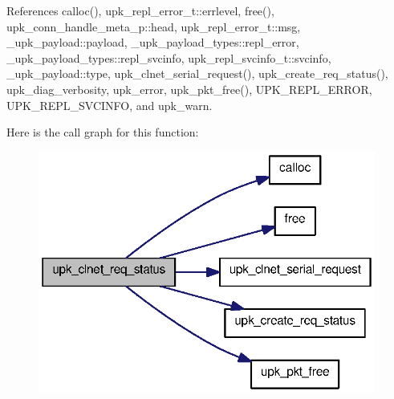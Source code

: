 References calloc(), upk\_\-repl\_\-error\_\-t::errlevel, free(), upk\_\-conn\_\-handle\_\-meta\_\-p::head, upk\_\-repl\_\-error\_\-t::msg, \_\-upk\_\-payload::payload, \_\-upk\_\-payload\_\-types::repl\_\-error, \_\-upk\_\-payload\_\-types::repl\_\-svcinfo, upk\_\-repl\_\-svcinfo\_\-t::svcinfo, \_\-upk\_\-payload::type, upk\_\-clnet\_\-serial\_\-request(), upk\_\-create\_\-req\_\-status(), upk\_\-diag\_\-verbosity, upk\_\-error, upk\_\-pkt\_\-free(), UPK\_\-REPL\_\-ERROR, UPK\_\-REPL\_\-SVCINFO, and upk\_\-warn.



Here is the call graph for this function:
\nopagebreak
\begin{figure}[H]
\begin{center}
\leavevmode
\includegraphics[width=314pt]{upk__client__net_8c_a222200fea80f3367f682ac816f8cd62b_cgraph}
\end{center}
\end{figure}


